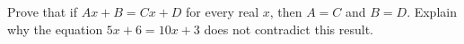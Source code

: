 Prove that if $Ax+B=Cx+D$ for every real $x$, then $A=C$ and $B=D$. Explain why the equation $5x+6=10x+3$ does not contradict this result.
